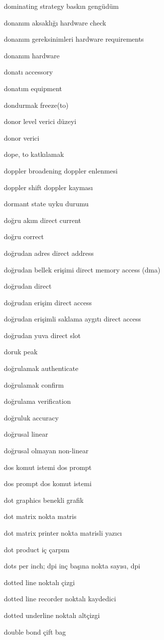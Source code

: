 \documentclass[12pt,fleqn]{article}\usepackage{../../common}
\begin{document}
dominating strategy baskın gengüdüm

donanım aksaklığı hardware check

donanım gereksinimleri hardware requirements

donanım hardware

donatı accessory

donatım equipment

dondurmak freeze(to)

donor level verici düzeyi

donor verici

dope, to katkılamak

doppler broadening doppler enlenmesi

doppler shift doppler kayması

dormant state uyku durumu

doğru akım direct current

doğru correct

doğrudan adres direct address

doğrudan bellek erişimi direct memory access (dma)

doğrudan direct

doğrudan erişim direct access

doğrudan erişimli saklama aygıtı direct access

doğrudan yuva direct slot

doruk peak

doğrulamak authenticate

doğrulamak confirm

doğrulama verification

doğruluk accuracy

doğrusal linear

doğrusal olmayan non-linear

dos komut istemi dos prompt

dos prompt dos komut istemi

dot graphics benekli grafik

dot matrix nokta matris

dot matrix printer nokta matrisli yazıcı

dot product iç çarpım

dots per inch; dpi inç başına nokta sayısı, dpi

dotted line noktalı çizgi

dotted line recorder noktalı kaydedici

dotted underline noktalı altçizgi

double bond çift bag
\end{document}

